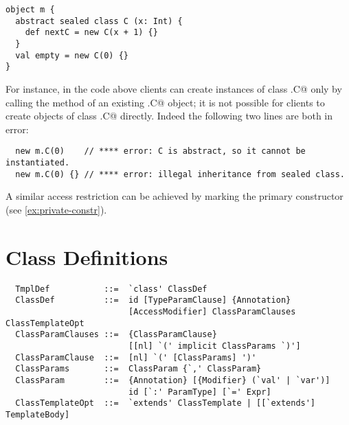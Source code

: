 \begin{lstlisting}
object m {
  abstract sealed class C (x: Int) {
    def nextC = new C(x + 1) {}
  }
  val empty = new C(0) {}
}
\end{lstlisting}
For instance, in the code above clients can create instances of class
\lstinline@m.C@ only by calling the  method of an existing \lstinline@m.C@
object; it is not possible for clients to create objects of class
\lstinline@m.C@ directly. Indeed the following two lines are both in error:

\begin{lstlisting}
  new m.C(0)    // **** error: C is abstract, so it cannot be instantiated.
  new m.C(0) {} // **** error: illegal inheritance from sealed class.
\end{lstlisting}

A similar access restriction can be achieved by marking the primary
constructor  (see \ref{ex:private-constr}).

\section{Class Definitions}
\label{sec:class-defs}

\syntax\begin{lstlisting} 
  TmplDef           ::=  `class' ClassDef 
  ClassDef          ::=  id [TypeParamClause] {Annotation} 
                         [AccessModifier] ClassParamClauses ClassTemplateOpt 
  ClassParamClauses ::=  {ClassParamClause} 
                         [[nl] `(' implicit ClassParams `)']
  ClassParamClause  ::=  [nl] `(' [ClassParams] ')'
  ClassParams       ::=  ClassParam {`,' ClassParam}
  ClassParam        ::=  {Annotation} [{Modifier} (`val' | `var')] 
                         id [`:' ParamType] [`=' Expr]
  ClassTemplateOpt  ::=  `extends' ClassTemplate | [[`extends'] TemplateBody]
\end{lstlisting}

